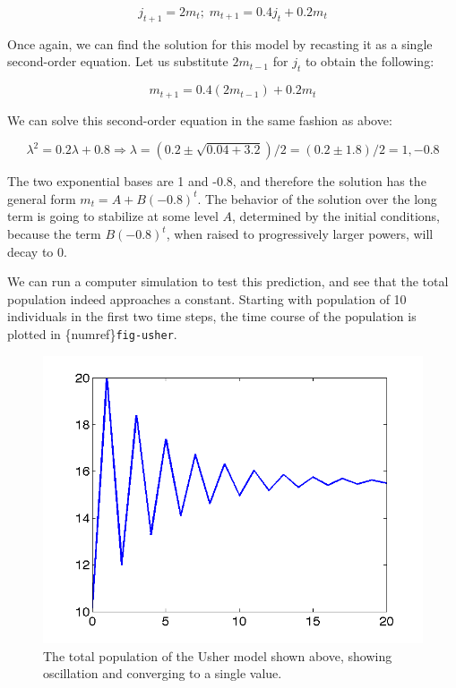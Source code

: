\documentclass[
  letterpaper,
  DIV=11,
  numbers=noendperiod]{scrreprt}
\begin{document}
\[
j_{t+1} = 2 m_t ; \; m_{t+1} = 0.4 j_t +0.2m_t
\]

Once again, we can find the solution for this model by recasting it as a
single second-order equation. Let us substitute \(2m_{t-1}\) for \(j_t\)
to obtain the following:

\[
m_{t+1} = 0.4(2 m_{t-1} )+ 0.2 m_t
\]

We can solve this second-order equation in the same fashion as above:

\[
\lambda^2 = 0.2 \lambda + 0.8 \Rightarrow \lambda = (0.2 \pm \sqrt {0.04+3.2})/2 = (0.2 \pm 1.8)/2 = 1, -0.8
\]

The two exponential bases are 1 and -0.8, and therefore the solution has
the general form \(m_t = A + B(-0.8)^t\). The behavior of the solution
over the long term is going to stabilize at some level \(A\), determined
by the initial conditions, because the term \(B(-0.8)^t\), when raised
to progressively larger powers, will decay to 0.

We can run a computer simulation to test this prediction, and see that
the total population indeed approaches a constant. Starting with
population of 10 individuals in the first two time steps, the time
course of the population is plotted in \{numref\}\texttt{fig-usher}.

\begin{figure}

{\centering \includegraphics{./images/usher_dynamics.png}

}

\caption{The total population of the Usher model shown above, showing
oscillation and converging to a single value.}

\end{figure}
\end{document}

